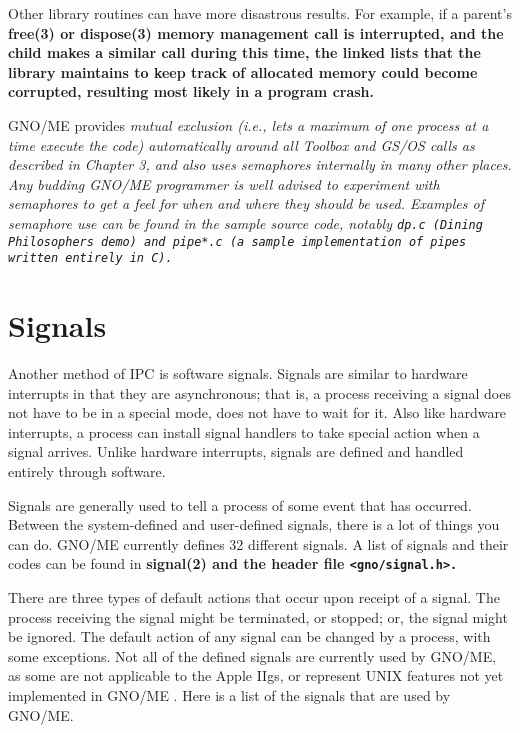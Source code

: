 \documentclass{report}
\begin{document}
Other library routines can have more
disastrous results. For example, if a parent's 
\bf free\rm(3) or \bf dispose\rm(3)
memory management call is interrupted, and the child makes a
similar call during this time, the linked lists that the library
maintains to keep track of allocated memory could become
corrupted, resulting most likely in a program crash.

GNO/ME provides \it mutual exclusion \rm
(i.e., lets a maximum of one process at a time execute the code)
automatically around all Toolbox and GS/OS calls as described in
Chapter 3, and also uses semaphores internally in many other
places. Any budding GNO/ME programmer is well advised to
experiment with semaphores to get a feel for when and where they
should be used. Examples of semaphore use can be found in the
sample source code, notably \tt dp.c \rm
(Dining Philosophers demo) and \tt pipe*.c \rm 
(a sample implementation of pipes written entirely in C).

\section{Signals}


Another method of IPC is software signals.
Signals are similar to hardware interrupts in that they are
asynchronous; that is, a process receiving a signal does not have
to be in a special mode, does not have to wait for it. Also like
hardware interrupts, a process can install signal handlers to
take special action when a signal arrives. Unlike hardware
interrupts, signals are defined and handled entirely through
software.

Signals are generally used to tell a
process of some event that has occurred. Between the
system-defined and user-defined signals, there is a lot of things
you can do. GNO/ME currently defines 32 different signals. A list
of signals and their codes can be found in \bf signal\rm(2) and
the header file \tt <gno/signal.h>\rm.

There are three types of default actions
that occur upon receipt of a signal. The process receiving the
signal might be terminated, or stopped; or, the signal might be
ignored. The default action of any signal can be changed by a
process, with some exceptions. Not all of the defined signals are
currently used by GNO/ME, as some are not applicable to the Apple
IIgs, or represent UNIX features not yet implemented in GNO/ME .
Here is a list of the signals that are used by GNO/ME.
\end{document}
